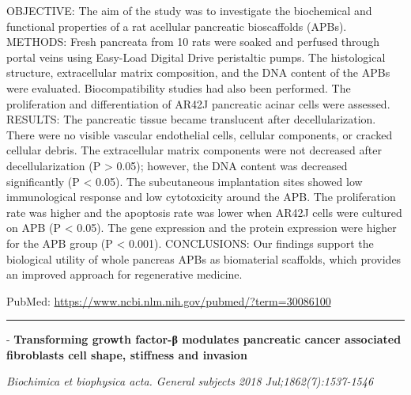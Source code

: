 \documentclass[]{article}
\begin{document}
OBJECTIVE: The aim of the study was to investigate the biochemical and
functional properties of a rat acellular pancreatic bioscaffolds (APBs).
METHODS: Fresh pancreata from 10 rats were soaked and perfused through
portal veins using Easy-Load Digital Drive peristaltic pumps. The
histological structure, extracellular matrix composition, and the DNA
content of the APBs were evaluated. Biocompatibility studies had also
been performed. The proliferation and differentiation of AR42J
pancreatic acinar cells were assessed. RESULTS: The pancreatic tissue
became translucent after decellularization. There were no visible
vascular endothelial cells, cellular components, or cracked cellular
debris. The extracellular matrix components were not decreased after
decellularization (P \textgreater{} 0.05); however, the DNA content was
decreased significantly (P \textless{} 0.05). The subcutaneous
implantation sites showed low immunological response and low
cytotoxicity around the APB. The proliferation rate was higher and the
apoptosis rate was lower when AR42J cells were cultured on APB (P
\textless{} 0.05). The gene expression and the protein expression were
higher for the APB group (P \textless{} 0.001). CONCLUSIONS: Our
findings support the biological utility of whole pancreas APBs as
biomaterial scaffolds, which provides an improved approach for
regenerative medicine.

PubMed: \url{https://www.ncbi.nlm.nih.gov/pubmed/?term=30086100}

{}

{}

\begin{center}\rule{0.5\linewidth}{\linethickness}\end{center}

 - \textbf{Transforming growth factor-β modulates pancreatic cancer
associated fibroblasts cell shape, stiffness and invasion}

\emph{Biochimica et biophysica acta. General subjects 2018
Jul;1862(7):1537-1546}
\end{document}
